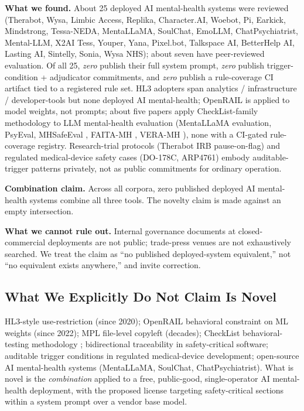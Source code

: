 \documentclass[letterpaper]{article} %
\begin{document}
\noindent\textbf{What we found.} About 25 deployed AI mental-health systems were reviewed (Therabot, Wysa, Limbic Access, Replika, Character.AI, Woebot, Pi, Earkick, Mindstrong, Tessa-NEDA, MentaLLaMA, SoulChat, EmoLLM, ChatPsychiatrist, Mental-LLM, X2AI Tess, Youper, Yana, Pixel.bot, Talkspace AI, BetterHelp AI, Lasting AI, Sintelly, Sonia, Wysa NHS); about seven have peer-reviewed evaluation. Of all 25, \emph{zero} publish their full system prompt, \emph{zero} publish trigger-condition + adjudicator commitments, and \emph{zero} publish a rule-coverage CI artifact tied to a registered rule set. HL3 adopters span analytics / infrastructure / developer-tools but none deployed AI mental-health; OpenRAIL is applied to model weights, not prompts; about five papers apply CheckList-family methodology to LLM mental-health evaluation (MentaLLaMA evaluation, PsyEval, MHSafeEval \citep{lee2026mhsafeeval}, FAITA-MH \citep{golden2024faitamh}, VERA-MH \citep{bentley2026veramh}), none with a CI-gated rule-coverage registry. Research-trial protocols (Therabot IRB pause-on-flag) and regulated medical-device safety cases (DO-178C, ARP4761) embody auditable-trigger patterns privately, not as public commitments for ordinary operation.

\noindent\textbf{Combination claim.} Across all corpora, zero published deployed AI mental-health systems combine all three tools. The novelty claim is made against an empty intersection.

\noindent\textbf{What we cannot rule out.} Internal governance documents at closed-commercial deployments are not public; trade-press venues are not exhaustively searched. We treat the claim as ``no published deployed-system equivalent,'' not ``no equivalent exists anywhere,'' and invite correction.

\subsection{What We Explicitly Do Not Claim Is Novel}

HL3-style use-restriction (since 2020); OpenRAIL behavioral constraint on ML weights (since 2022); MPL file-level copyleft (decades); CheckList behavioral-testing methodology \citep{ribeiro2020checklist}; bidirectional traceability in safety-critical software; auditable trigger conditions in regulated medical-device development; open-source AI mental-health systems (MentaLLaMA, SoulChat, ChatPsychiatrist). What is novel is the \emph{combination} applied to a free, public-good, single-operator AI mental-health deployment, with the proposed license targeting safety-critical sections within a system prompt over a vendor base model.
\end{document}
